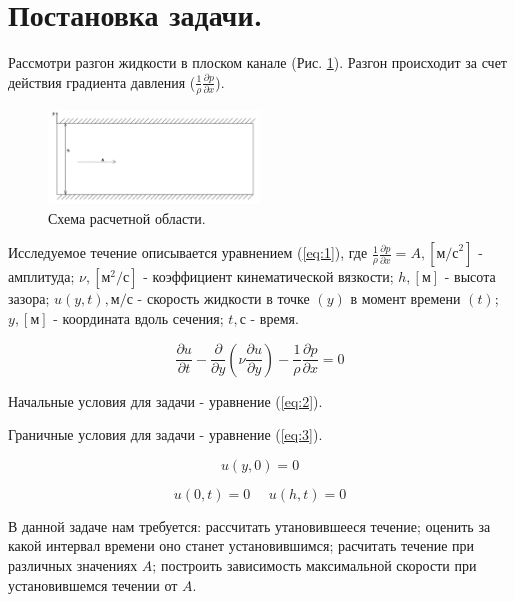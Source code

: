 \section{Постановка задачи.}
Рассмотри разгон жидкости в плоском канале (Рис. \ref{fig:1}). Разгон происходит за счет действия градиента давления ($\frac{1}{\rho}\frac{\partial{p}}{\partial{x}}$).

\begin{figure}[H]
    \centering
    \includegraphics[width=0.5\textwidth]{images/1.png}
    \caption{Схема расчетной области.}
    \label{fig:1}
\end{figure}

Исследуемое течение описывается уравнением (\ref{eq:1}), где $\frac{1}{\rho}\frac{\partial p}{\partial x}=A, [\text{м/с}^2]$ - амплитуда;
$\nu, [\text{м}^2/\text{с}]$ - коэффициент кинематической вязкости; $h, [\text{м}]$ - высота зазора; $u(y,t), \text{м/с}$ - скорость жидкости в точке $(y)$ в момент времени $(t)$; $y, [\text{м}]$ - координата вдоль сечения; $t, \text{с}$ - время.    

\begin{equation}
    \frac{\partial u}{\partial t}-\frac{\partial}{\partial y} \left( \nu \frac{\partial u}{\partial y} \right)-\frac{1}{\rho}\frac{\partial p}{\partial x} = 0
\label{eq:1}
\end{equation}

Начальные условия для задачи - уравнение (\ref{eq:2}). 

Граничные условия для задачи - уравнение (\ref{eq:3}).

\begin{equation}
    u(y,0) = 0
\label{eq:2}
\end{equation}

\begin{equation}
    u(0,t) = 0 ~~~~~~u(h,t) = 0
\label{eq:3}
\end{equation}

В данной задаче нам требуется: рассчитать утановившееся течение; оценить за какой интервал времени оно станет установившимся;
расчитать течение при различных значениях $A$; построить зависимость максимальной скорости при установившемся течении от $A$.

